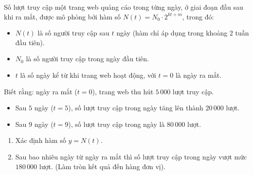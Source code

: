 \begin{bt}%
	Số lượt truy cập một trang web quảng cáo trong từng ngày, ở giai đoạn đầu sau khi ra mắt, được mô phỏng bởi hàm số $N(t)=N_0\cdot 2^{kt+m}$, trong đó:
	\begin{itemize}
		\item $N(t)$ là số người truy cập sau $t$ ngày (hàm chỉ áp dụng trong khoảng $2$ tuần đầu tiên).
		\item $N_0$ là số người truy cập trong ngày đầu tiên.
		\item $t$ là số ngày kể từ khi trang web hoạt động, với $t=0$ là ngày ra mắt.
	\end{itemize}
	Biết rằng: ngày ra mắt ($t=0$), trang web thu hút $5\,000$ lượt truy cập.
	\begin{itemize}
		\item Sau $5$ ngày ($t=5$), số lượt truy cập trong ngày tăng lên thành $20\,000$ lượt.
		\item Sau $9$ ngày ($t=9$), số lượt truy cập trong ngày là $80\,000$ lượt.
	\end{itemize}
	\begin{enumerate}
		\item Xác định hàm số $y=N(t)$.
		\item Sau bao nhiêu ngày từ ngày ra mắt thì số lượt truy cập trong ngày vượt mức $180\,000$ lượt. (Làm tròn kết quả đến hàng đơn vị).
	\end{enumerate}
\end{bt}
